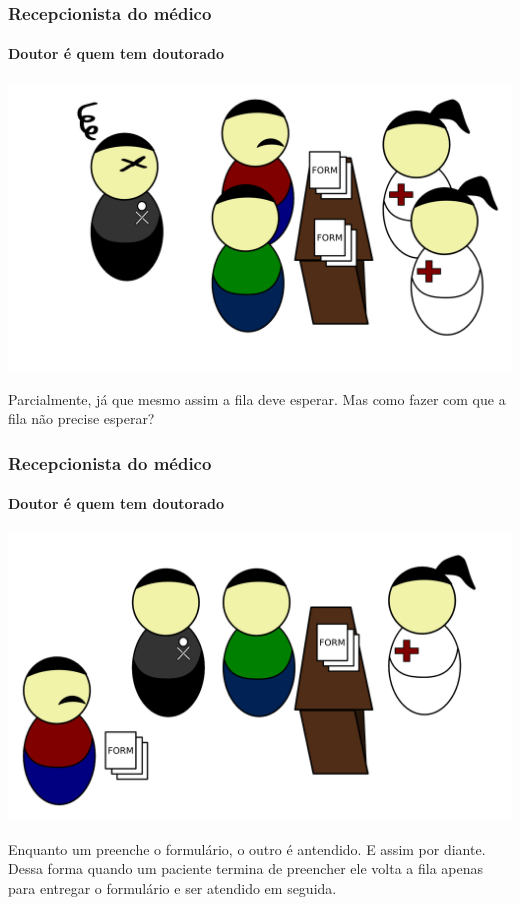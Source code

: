 \begin{frame}\frametitle{Recepcionista do médico}

\framesubtitle{Doutor é quem tem doutorado}

\includegraphics[scale=0.35]{img/ex1-2.png}

Parcialmente, já que mesmo assim a fila deve esperar. Mas como fazer com
que a fila não precise esperar?

\end{frame}

\begin{frame}\frametitle{Recepcionista do médico}

\framesubtitle{Doutor é quem tem doutorado}

\includegraphics[scale=0.35]{img/ex1-3.png}

Enquanto um preenche o formulário, o outro é antendido. E assim por
diante. Dessa forma quando um paciente termina de preencher ele volta a
fila apenas para entregar o formulário e ser atendido em seguida.

\end{frame}

